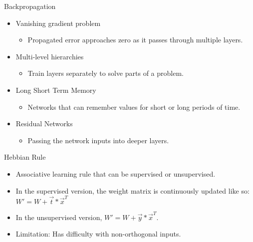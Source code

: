 \documentclass[11pt]{beamer}
\begin{document}
\begin{frame}{Backpropagation}
\begin{itemize}
    \item Vanishing gradient problem
    \begin{itemize}
        \item Propagated error approaches zero as it passes through multiple layers.
    \end{itemize}
    \item Multi-level hierarchies
    \begin{itemize}
    	\item Train layers separately to solve parts of a problem.
    \end{itemize}
    \item Long Short Term Memory
    \begin{itemize} 
        \item Networks that can remember values for short or long periods of time.
    \end{itemize}
    \item Residual Networks
    \begin{itemize} 
        \item Passing the network inputs into deeper layers.
    \end{itemize}
\end{itemize}
\end{frame}

\begin{frame}{Hebbian Rule}
\begin{itemize}
\item Associative learning rule that can be supervised or unsupervised. \\
\item In the supervised version, the weight matrix is continuously updated like so: $W' = W + \vec{t} * \vec{x}^T$ \\
\item In the unsupervised version, $W' = W + \vec{y} * \vec{x}^T$. \\
\item Limitation: Has difficulty with non-orthogonal inputs.
\end{itemize}
\end{frame}
\end{document}
